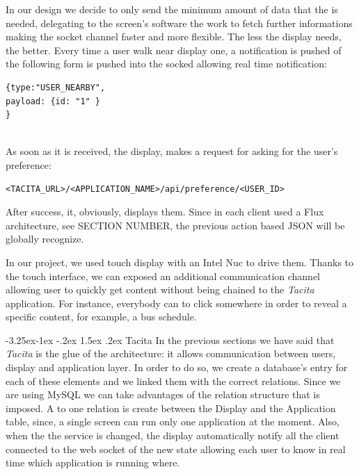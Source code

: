 \documentclass[]{usiinfbachelorproject}
\makeatletter
\newcommand\subsubsection{\@startsection{subsubsection}{3}{\z@}%
                {-3.25ex\@plus -1ex \@minus -.2ex}%
                {1.5ex \@plus .2ex}%
                {\normalfont\normalsize\bfseries}}
\makeatother
\begin{document}
In our design we decide to only send the minimum amount of data that the is needed, delegating to the screen's software the work to fetch further informations making the socket channel faster and more flexible. The less the display needs, the better. Every time a user walk near display one, a notification is pushed of the following form is pushed into the socked allowing real time notification:
\begin{lstlisting}
{type:"USER_NEARBY",
payload: {id: "1" }
}
\end{lstlisting}
\\
As soon as it is received, the display, makes a request for asking for the user's preference:
\begin{lstlisting}
<TACITA_URL>/<APPLICATION_NAME>/api/preference/<USER_ID>
\end{lstlisting}
After success, it, obviously, displays them.
Since in each client used a Flux architecture, see SECTION NUMBER, the previous action based JSON will be globally recognize.

In our project, we used touch display with an Intel Nuc to drive them. Thanks to the touch interface, we can exposed an additional communication channel allowing user to quickly get content without being chained to the \emph{Tacita} application. For instance, everybody can to click somewhere in order to reveal a specific content, for example, a bus schedule.
  
\subsubsection{Tacita}
In the previous sections we have said that \emph{Tacita} is the glue of the architecture: it allows communication between users, display and application layer. In order to do so, we create a database's entry for each of these elements and we linked them with the correct relations. Since we are using MySQL we can take advantages of the relation structure that is imposed. A \one to one relation is create between the Display and the Application table, since, a single screen can run only one application at the moment. Also, when the the service is changed, the display automatically notify all the client connected to the web socket of the new state allowing each user to know in real time which application is running where.
\end{document}
